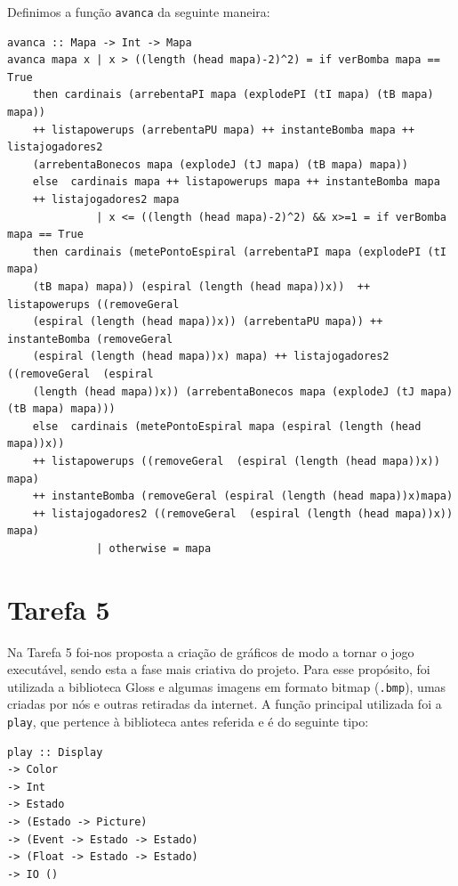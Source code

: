 \documentclass[a4paper]{article}
\begin{document}
Definimos a função \texttt{avanca} da seguinte maneira:
\begin{verbatim}
avanca :: Mapa -> Int -> Mapa
avanca mapa x | x > ((length (head mapa)-2)^2) = if verBomba mapa == True 
    then cardinais (arrebentaPI mapa (explodePI (tI mapa) (tB mapa) mapa)) 
    ++ listapowerups (arrebentaPU mapa) ++ instanteBomba mapa ++ listajogadores2 
    (arrebentaBonecos mapa (explodeJ (tJ mapa) (tB mapa) mapa))
    else  cardinais mapa ++ listapowerups mapa ++ instanteBomba mapa 
    ++ listajogadores2 mapa
              | x <= ((length (head mapa)-2)^2) && x>=1 = if verBomba mapa == True
    then cardinais (metePontoEspiral (arrebentaPI mapa (explodePI (tI mapa) 
    (tB mapa) mapa)) (espiral (length (head mapa))x))  ++ listapowerups ((removeGeral 
    (espiral (length (head mapa))x)) (arrebentaPU mapa)) ++ instanteBomba (removeGeral 
    (espiral (length (head mapa))x) mapa) ++ listajogadores2 ((removeGeral  (espiral 
    (length (head mapa))x)) (arrebentaBonecos mapa (explodeJ (tJ mapa) (tB mapa) mapa)))
    else  cardinais (metePontoEspiral mapa (espiral (length (head mapa))x)) 
    ++ listapowerups ((removeGeral  (espiral (length (head mapa))x)) mapa) 
    ++ instanteBomba (removeGeral (espiral (length (head mapa))x)mapa) 
    ++ listajogadores2 ((removeGeral  (espiral (length (head mapa))x)) mapa)
              | otherwise = mapa
\end{verbatim}

\section{Tarefa 5}
\label{t5}
Na Tarefa 5 foi-nos proposta a criação de gráficos de modo a tornar o jogo executável, sendo esta a fase mais criativa do projeto. Para esse propósito, foi utilizada a biblioteca Gloss e algumas imagens em formato bitmap (\texttt{.bmp}), umas criadas por nós e outras retiradas da internet. A função principal utilizada foi a \texttt{play}, que pertence à biblioteca antes referida e é do seguinte tipo:
\begin{verbatim}
play :: Display
-> Color 
-> Int 
-> Estado 
-> (Estado -> Picture) 
-> (Event -> Estado -> Estado) 
-> (Float -> Estado -> Estado) 
-> IO ()
\end{verbatim}
\end{document}
